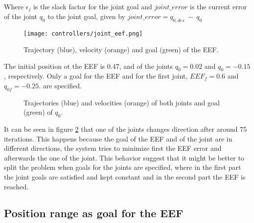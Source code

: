 Where $\epsilon_j$ is the slack factor for the joint goal and $joint\_error$ is the current error of the joint $q_{0}$ to the joint goal, given by $joint\_error = q_{0,des}\ -\ q_{0}$

\begin{figure}[H]
	\centering
	\texttt{[image: controllers/joint\_eef.png]}
	\vspace{-10pt}
	\caption[Joint and EEF goal: EEF trajectory]{Trajectory (blue), velocity (orange) and goal (green) of the EEF.}
	\vspace{-15pt}
	\label{fig:joint_eef}
\end{figure}
The initial position ot the EEF is $0.47$, and of the joints $q_{0}= 0.02$ and $q_{0}= -0.15$, respectively. Only a goal for the EEF and for the first joint, $EEF_{f}= 0.6$ and $q_{0f} = -0.25$. are specified.
\begin{figure}[H]
	\centering
	\begin{subfigure}[][Joint $q_{0}$]
		{\texttt{[image: controllers/joint\_q0.png]}}
	\end{subfigure}
	\begin{subfigure}[][Joint $q_{1}$]
		{\texttt{[image: controllers/joint\_q1.png]}}
	\end{subfigure}
	\vspace{-12pt}
	\caption[Joint and EEF goal: Joints Trajectories]{Trajectories (blue) and velocities (orange) of both joints and goal (green) of $q_{0}$.}
	\vspace{-10pt}
	\label{fig:joint_0}
\end{figure}

It can be seen in figure \ref{fig:joint_0} that one of the joints changes direction after around 75 iterations. This happens because the goal of the EEF and of the joint are in different directions, the system tries to minimize first the EEF error and afterwards the one of the joint. This behavior suggest  that it might be better to split the problem when goals for the joints are specified, where in the first part the joint goals are satisfied and kept constant and in the second part the EEF is reached.


\subsection{Position range as goal for the EEF}

